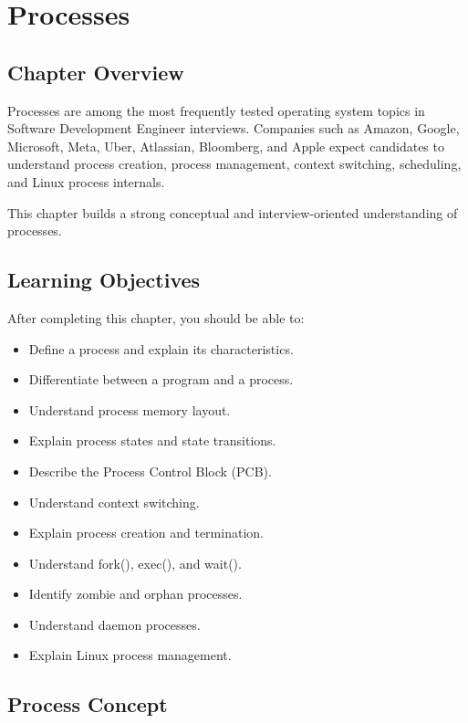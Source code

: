\chapter{Processes}

\section{Chapter Overview}

Processes are among the most frequently tested operating system topics in Software Development Engineer interviews. Companies such as Amazon, Google, Microsoft, Meta, Uber, Atlassian, Bloomberg, and Apple expect candidates to understand process creation, process management, context switching, scheduling, and Linux process internals.

This chapter builds a strong conceptual and interview-oriented understanding of processes.

\section{Learning Objectives}

After completing this chapter, you should be able to:

\begin{itemize}
\item Define a process and explain its characteristics.
\item Differentiate between a program and a process.
\item Understand process memory layout.
\item Explain process states and state transitions.
\item Describe the Process Control Block (PCB).
\item Understand context switching.
\item Explain process creation and termination.
\item Understand fork(), exec(), and wait().
\item Identify zombie and orphan processes.
\item Understand daemon processes.
\item Explain Linux process management.
\end{itemize}

\section{Process Concept}


